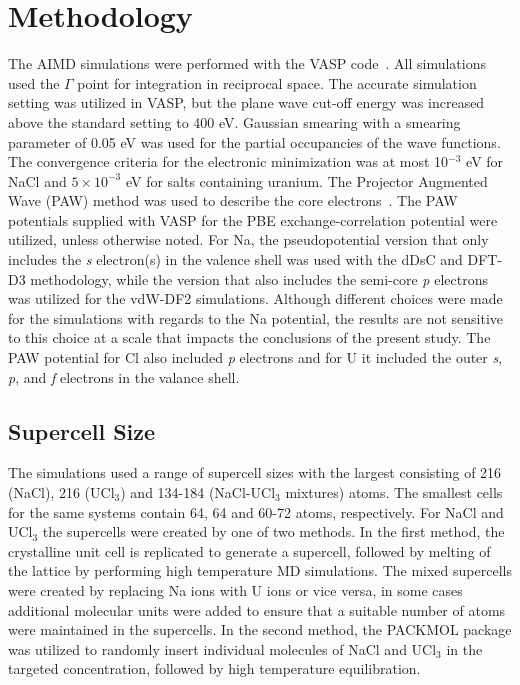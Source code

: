\documentclass[preprint,3p,10pt,onecolumn,number,sort&compress]{elsarticle}
\begin{document}
\section{Methodology}
\label{sec:method}
The AIMD simulations were performed with the VASP code~\cite{Kresse1996}. All simulations used the $\Gamma$ point for integration in reciprocal space. The accurate simulation setting was utilized in VASP, but the plane wave cut-off energy was increased above the standard setting to 400 eV. Gaussian smearing with a smearing parameter of 0.05 eV was used for the partial occupancies of the wave functions. The convergence criteria for the electronic minimization was at most 10$^{-3}$ eV for NaCl and $5\times10^{-3}$ eV for salts containing uranium. The Projector Augmented Wave (PAW) method was used to describe the core electrons~\cite{PAW1,PAW2}. The PAW potentials supplied with VASP for the PBE exchange-correlation potential were utilized, unless otherwise noted. For Na, the pseudopotential version that only includes the \textit{s} electron(s) in the valence shell was used with the dDsC and DFT-D3 methodology, while the version that also includes the semi-core \textit{p} electrons was utilized for the vdW-DF2 simulations. Although different choices were made for the simulations with regards to the Na potential, the results are not sensitive to this choice at a scale that impacts the conclusions of the present study. The PAW potential for Cl also included \textit{p} electrons and for U it included the outer \textit{s}, \textit{p}, and \textit{f} electrons in the valance shell. 

\subsection{Supercell Size}
The simulations used a range of supercell sizes with the largest consisting of 216 (NaCl), 216 (UCl$_3$) and 134-184 (NaCl-UCl$_3$ mixtures) atoms. The smallest cells for the same systems contain 64, 64 and 60-72 atoms, respectively. %
For NaCl and UCl$_3$ the supercells were created by one of two methods. In the first method, the crystalline unit cell is replicated to generate a supercell, followed by melting of the lattice by performing high temperature MD simulations. The mixed supercells were created by replacing Na ions with U ions or vice versa, in some cases additional molecular units were added to ensure that a suitable number of atoms were maintained in the supercells. In the second method, the PACKMOL package \cite{packmol} was utilized to randomly insert individual molecules of NaCl and UCl$_3$ in the targeted concentration, followed by high temperature equilibration. 
\end{document}
